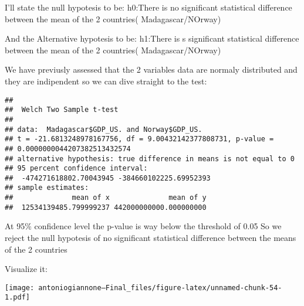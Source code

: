 \documentclass[
]{article}
\newenvironment{Shaded}{\begin{snugshade}}{\end{snugshade}}
\newcommand{\AttributeTok}[1]{\textcolor[rgb]{0.13,0.29,0.53}{#1}}
\newcommand{\FunctionTok}[1]{\textcolor[rgb]{0.13,0.29,0.53}{\textbf{#1}}}
\newcommand{\NormalTok}[1]{#1}
\newcommand{\SpecialCharTok}[1]{\textcolor[rgb]{0.81,0.36,0.00}{\textbf{#1}}}
\newcommand{\StringTok}[1]{\textcolor[rgb]{0.31,0.60,0.02}{#1}}
\begin{document}
I'll state the null hypotesis to be: h0:There is no significant
statistical difference between the mean of the 2 countries(
Madagascar/NOrway)

And the Alternative hypotesis to be: h1:There is s significant
statistical difference between the mean of the 2 countries(
Madagascar/NOrway)

We have previusly assessed that the 2 variables data are normaly
distributed and they are indipendent so we can dive straight to the
test:

\begin{Shaded}
\end{Shaded}

\begin{verbatim}
## 
##  Welch Two Sample t-test
## 
## data:  Madagascar$GDP_US. and Norway$GDP_US.
## t = -21.6813248978167756, df = 9.00432142377808731, p-value =
## 0.0000000044207382513432574
## alternative hypothesis: true difference in means is not equal to 0
## 95 percent confidence interval:
##  -474271618802.70043945 -384660102225.69952393
## sample estimates:
##              mean of x              mean of y 
##  12534139485.799999237 442000000000.000000000
\end{verbatim}

At 95\% confidence level the p-value is way below the threshold of 0.05
So we reject the null hypotesis of no significant statistical difference
between the means of the 2 countries

Visualize it:

\begin{Shaded}
\end{Shaded}

\texttt{[image: antoniogiannone---Final\_files/figure-latex/unnamed-chunk-54-1.pdf]}

\begin{Shaded}
\end{Shaded}
\end{document}
